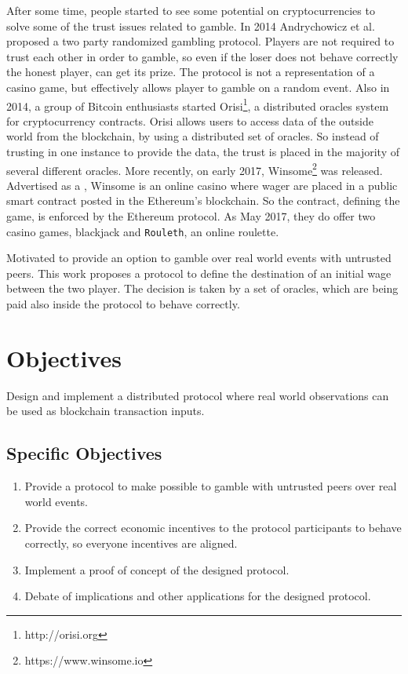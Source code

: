 \begin{intro}
After some time, people started to see some potential on cryptocurrencies to
  solve some of the trust issues related to gamble. In 2014 Andrychowicz et
  al. proposed a two party randomized gambling
  protocol. Players are not required to trust each other in order to gamble, so
  even if the loser does not behave correctly the honest player, can get its
  prize.
The protocol is not a representation of a casino game, but effectively allows
  player to gamble on a random event. 
Also in 2014, a group of Bitcoin enthusiasts started
  Orisi\footnote{http://orisi.org},  a distributed oracles system for
  cryptocurrency contracts.
Orisi allows users to access data of the outside world from the blockchain,
  by using a distributed set of oracles. So instead of trusting in one instance
  to provide the data, the trust is placed in the majority of several different
  oracles.
More recently, on early 2017, Winsome\footnote{https://www.winsome.io} was
  released. Advertised as a , Winsome
  is an online casino where wager are placed in a public smart contract posted
  in the Ethereum's blockchain. So the contract, defining the game, is enforced
  by the Ethereum protocol. As May 2017, they do offer two casino games,
  blackjack and \texttt{Rouleth}, an online roulette.
  
Motivated to provide an option to gamble over real world events with untrusted
 peers. This work proposes a protocol to define the destination of an initial
 wage between the two player. The decision is taken by a set of oracles, which
 are being paid also inside the protocol to behave correctly.

\section{Objectives}
Design and implement a distributed protocol where real world observations can
  be used as blockchain transaction inputs.

\subsection{Specific Objectives}
\begin{enumerate}
	\item Provide a protocol to make possible to gamble with untrusted peers over
	  real world events.
	\item Provide the correct economic incentives to the protocol participants to
	  behave correctly, so everyone incentives are aligned. 
	\item Implement a proof of concept of the designed protocol.
	\item Debate of implications and other applications for the designed protocol.
\end{enumerate}


\end{intro}
